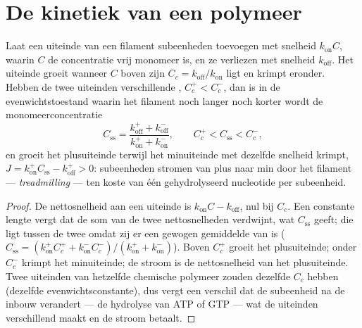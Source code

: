 \section{De kinetiek van een polymeer}

\begin{theorem}\label{thm:b3:cytoskeleton-motility:treadmilling}
Laat een uiteinde van een filament subeenheden toevoegen met snelheid
$k_{\text{on}}C$, waarin $C$ de concentratie vrij monomeer is, en ze
verliezen met snelheid $k_{\text{off}}$. Het uiteinde groeit wanneer
$C$ boven zijn \emph{}
$C_{c} = k_{\text{off}}/k_{\text{on}}$ ligt en krimpt eronder. Hebben
de twee uiteinden verschillende , $C_{c}^{+}
< C_{c}^{-}$, dan is in de evenwichtstoestand waarin het filament noch
langer noch korter wordt de monomeerconcentratie
\[
C_{\text{ss}} = \frac{k_{\text{off}}^{+} + k_{\text{off}}^{-}}
{k_{\text{on}}^{+} + k_{\text{on}}^{-}},
\qquad C_{c}^{+} < C_{\text{ss}} < C_{c}^{-},
\]
en groeit het plusuiteinde terwijl het minuiteinde met dezelfde
snelheid krimpt,
$J = k_{\text{on}}^{+}C_{\text{ss}} - k_{\text{off}}^{+} > 0$:
subeenheden stromen van plus naar min door het filament ---
\emph{treadmilling} --- ten koste van één gehydrolyseerd nucleotide per
subeenheid.
\end{theorem}
\begin{proof}
De nettosnelheid aan een uiteinde is $k_{\text{on}}C - k_{\text{off}}$,
nul bij $C_{c}$. Een constante lengte vergt dat de som van de twee
nettosnelheden verdwijnt, wat $C_{\text{ss}}$ geeft; die ligt tussen de
twee  omdat zij er een gewogen gemiddelde van is
($C_{\text{ss}} =
(k_{\text{on}}^{+}C_{c}^{+} + k_{\text{on}}^{-}C_{c}^{-})/(k_{\text{on}}^{+}
+ k_{\text{on}}^{-})$). Boven $C_{c}^{+}$ groeit het plusuiteinde;
onder $C_{c}^{-}$ krimpt het minuiteinde; de stroom is de nettosnelheid
van het plusuiteinde. Twee uiteinden van hetzelfde chemische polymeer
zouden dezelfde $C_{c}$ hebben (dezelfde evenwichtsconstante), dus
vergt een verschil dat de subeenheid na de inbouw verandert --- de
hydrolyse van ATP of GTP --- wat de uiteinden verschillend maakt en de
stroom betaalt.
\end{proof}

